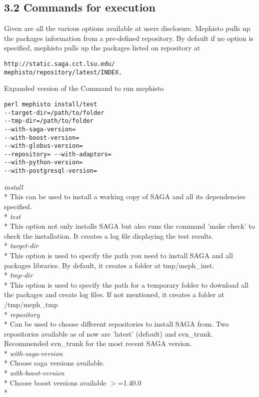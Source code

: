 \documentclass[a4paper,10pt]{article}
\begin{document}
\begin{multicols}{2}
\subsection*{\normalsize 3.2 Commands for execution}
Given are all the various options available at users disclosure. Mephisto pulls up the packages information from a pre-defined repository. 
By default if no option is specified, mephisto pulls up the packages listed on repository at
\begin{verbatim} 
http://static.saga.cct.lsu.edu/
mephisto/repository/latest/INDEX. 
\end{verbatim}
Expanded version of the Command to run mephisto
\begin{verbatim} 
perl mephisto install/test 
--target-dir=/path/to/folder 
--tmp-dir=/path/to/folder 
--with-saga-version= 
--with-boost-version= 
--with-globus-version= 
--repository= --with-adaptors= 
--with-python-version= 
--with-postgresql-version=
\end{verbatim} 
\emph{install} \\*
 This can be used to install a working copy of SAGA and all its 
 dependencies specified. \\*
\emph{test} \\*
 This option not only installs SAGA but also runs the command 
 'make check' to check the installation. It creates a log file displaying 
 the test results. \\*
\emph{target-dir} \\*
 This option is used to specify the path you need to install SAGA and all 
 packages libraries. By default, it creates a folder at tmp/meph\_inst.\\*
\emph{tmp-dir} \\*
 This option is used to specify the path for a temporary folder to 
 download all the packages and create log files. If not mentioned, it 
 creates a folder at /tmp/meph\_tmp\\*
\emph{repository} \\*
 Can be used to choose different repositories to install SAGA from. 
 Two repositories available as of now are 'latest' (default) and svn\_trunk. 
 Recommended svn\_trunk for the most recent SAGA version. \\*
\emph{with-saga-version}\\*
 Choose saga versions available.\\*
\emph{with-boost-version}\\*
Choose boost versions available $>$=1.40.0\\*

\end{multicols}
\end{document}
